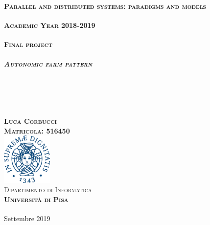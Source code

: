 \documentclass[12pt]{report}
\begin{document}
\begin{titlepage}

\newcommand{\HRule}{\rule{\linewidth}{0.5mm}} %

\center %
 

\textsc{\Large \textbf{Parallel and distributed systems: paradigms and models \\}}\\[0.50cm]
\textsc{\Large \textbf{Academic Year 2018-2019 \\}}\\[0.75cm]
\textsc{\Large \textbf{Final project \\}}\\[0.75cm]

\textsc{\Large \textbf{\it{Autonomic farm pattern \\}}}\\[0.50cm]

{ \it \\[0.5cm]}{\\[0.5cm]\\[0.75cm]}\\[3.0cm]\textsc{\textbf{Luca Corbucci \\[0.35cm]Matricola: 516450}}\\[1cm] %


\includegraphics[width=2.5cm]{Stemma_unipi.png}\\[2cm]
 
\textsc{Dipartimento di Informatica\\[0.15cm]\textsc{\textbf{Università di Pisa}}\\[0.05cm]\\[0.15cm]}{Settembre 2019}
\end{titlepage}
\end{document}
